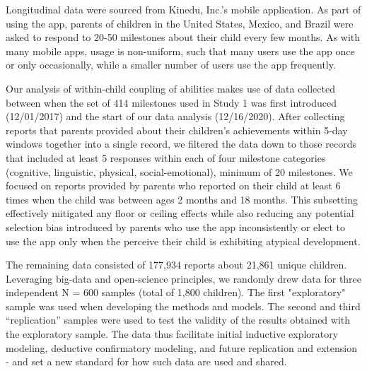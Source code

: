 \documentclass[man, floatsintext]{apa7}
\begin{document}
Longitudinal data were sourced from Kinedu, Inc.'s mobile application. As part of using the app, parents of children in the United States, Mexico, and Brazil were asked to
respond to 20-50 milestones about their child every few months. As with
many mobile apps, usage is non-uniform, such that many users use the app
once or only occasionally, while a smaller number of users use the app frequently.


Our analysis of within-child coupling of abilities makes use of data collected between
when the set of 414 milestones used in Study 1 was first introduced (12/01/2017) and the start
of our data analysis (12/16/2020). After collecting reports that parents provided about their children's achievements within 5-day windows together into a single record, we filtered the data down to those records that included at least 5
responses within each of four milestone categories (cognitive, linguistic, physical,
social-emotional), minimum of 20 milestones. We focused on reports provided by parents who reported on their child at least 6 times when the child was between ages 2 months and 18 months. This subsetting effectively mitigated any floor or ceiling effects while also reducing any potential selection bias introduced by parents who use the app inconsistently or elect to use the app only when the perceive their child is exhibiting atypical development.

The remaining data consisted of 177,934 reports about 21,861 unique children. Leveraging big-data and open-science principles, we randomly drew data for three independent N = 600 samples (total of 1,800 children). The first "exploratory" sample was used when developing the methods and models. The second and third ``replication'' samples were used to test the validity of the results obtained with the exploratory sample. The data thus facilitate initial inductive exploratory modeling, deductive confirmatory modeling, and future replication and extension - and set a new standard for how such data are used and shared.
\end{document}
